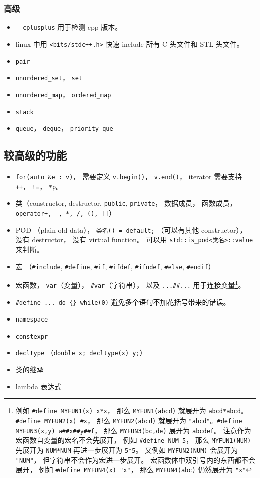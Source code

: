 \subsubsection{高级}
\begin{itemize}
\item \verb|__cplusplus| 用于检测 cpp 版本。
\item linux 中用 \verb|<bits/stdc++.h>| 快速 include 所有 C 头文件和 STL 头文件。
\item \verb|pair|
\item \verb|unordered_set|， \verb|set|
\item \verb|unordered_map|， \verb|ordered_map|
\item \verb|stack|
\item \verb|queue|， \verb|deque|， \verb|priority_que|
\end{itemize}

\subsection{较高级的功能}
\begin{itemize}
\item \verb|for(auto &e : v)|， 需要定义 \verb|v.begin()|， \verb|v.end()|， iterator 需要支持 \verb|++|， \verb|!=|， \verb|*p|。
\item 类（constructor, destructor, \verb|public|, \verb|private|， 数据成员， 函数成员， \verb|operator+, -, *, /, (), []|）
\item POD （plain old data）， \verb|类名() = default;| （可以有其他 constructor）， 没有 destructor， 没有 virtual function。 可以用 \verb|std::is_pod<类名>::value| 来判断。
\item 宏 （\verb|#include|, \verb|#define|, \verb|#if|, \verb|#ifdef|, \verb|#ifndef|, \verb|#else|, \verb|#endif|）
\item 宏函数， \verb|var|（变量）， \verb|#var|（字符串）， 以及 \verb|...##...| 用于连接变量\footnote{例如 \verb|#define MYFUN1(x) x*x|， 那么 \verb|MYFUN1(abcd)| 就展开为 \verb|abcd*abcd|。 \verb|#define MYFUN2(x) #x|， 那么 \verb|MYFUN2(abcd)| 就展开为 \verb|"abcd"|。\verb|#define MYFUN3(x,y) a##x##y##f|， 那么 \verb|MYFUN3(bc,de)| 展开为 \verb|abcdef|。 注意作为宏函数自变量的宏名不会\textbf{先}展开， 例如 \verb|#define NUM 5|， 那么 \verb|MYFUN1(NUM)| 先展开为 \verb|NUM*NUM| 再进一步展开为 \verb|5*5|。 又例如 \verb|MYFUN2(NUM)| 会展开为 \verb|"NUM"|， 但字符串不会作为宏进一步展开。 宏函数体中双引号内的东西都不会展开， 例如 \verb|#define MYFUN4(x) "x"|， 那么 \verb|MYFUN4(abc)| 仍然展开为 \verb|"x"|}。
\item \verb|#define ... do {} while(0)| 避免多个语句不加花括号带来的错误。
\item \verb|namespace|
\item \verb|constexpr|
\item \verb|decltype| （\verb|double x; decltype(x) y;|）
\item 类的继承
\item lambda 表达式
\end{itemize}

